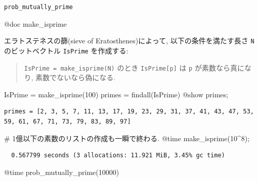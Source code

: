 \documentclass[
  letterpaper,
  DIV=11,
  numbers=noendperiod]{scrartcl}
\newenvironment{Shaded}{\begin{snugshade}}{\end{snugshade}}
\newcommand{\CommentTok}[1]{\textcolor[rgb]{0.37,0.37,0.37}{#1}}
\newcommand{\FloatTok}[1]{\textcolor[rgb]{0.68,0.00,0.00}{#1}}
\newcommand{\FunctionTok}[1]{\textcolor[rgb]{0.28,0.35,0.67}{#1}}
\newcommand{\NormalTok}[1]{\textcolor[rgb]{0.00,0.23,0.31}{#1}}
\newcommand{\OperatorTok}[1]{\textcolor[rgb]{0.37,0.37,0.37}{#1}}
\newcommand{\PreprocessorTok}[1]{\textcolor[rgb]{0.68,0.00,0.00}{#1}}
\begin{document}
\begin{verbatim}
prob_mutually_prime
\end{verbatim}

\begin{Shaded}
\begin{Highlighting}[]
\PreprocessorTok{@doc}\NormalTok{ make\_isprime}
\end{Highlighting}
\end{Shaded}

エラトステネスの篩(sieve of Eratosthenes)によって,
以下の条件を満たす長さ \texttt{N} のビットベクトル \texttt{IsPrime}
を作成する:

\begin{quote}
\texttt{IsPrime\ =\ make\_isprime(N)} のとき \texttt{IsPrime{[}p{]}} は
\texttt{p} が素数なら真になり, 素数でないなら偽になる.
\end{quote}

\begin{Shaded}
\begin{Highlighting}[]
\NormalTok{IsPrime }\OperatorTok{=} \FunctionTok{make\_isprime}\NormalTok{(}\FloatTok{100}\NormalTok{)}
\NormalTok{primes }\OperatorTok{=} \FunctionTok{findall}\NormalTok{(IsPrime) }
\PreprocessorTok{@show}\NormalTok{ primes;}
\end{Highlighting}
\end{Shaded}

\begin{verbatim}
primes = [2, 3, 5, 7, 11, 13, 17, 19, 23, 29, 31, 37, 41, 43, 47, 53, 59, 61, 67, 71, 73, 79, 83, 89, 97]
\end{verbatim}

\begin{Shaded}
\begin{Highlighting}[]
\CommentTok{\# 1億以下の素数のリストの作成も一瞬で終わる.}
\PreprocessorTok{@time} \FunctionTok{make\_isprime}\NormalTok{(}\FloatTok{10}\OperatorTok{\^{}}\FloatTok{8}\NormalTok{);}
\end{Highlighting}
\end{Shaded}

\begin{verbatim}
  0.567799 seconds (3 allocations: 11.921 MiB, 3.45% gc time)
\end{verbatim}

\begin{Shaded}
\begin{Highlighting}[]
\PreprocessorTok{@time} \FunctionTok{prob\_mutually\_prime}\NormalTok{(}\FloatTok{10000}\NormalTok{)}
\end{Highlighting}
\end{Shaded}
\end{document}

